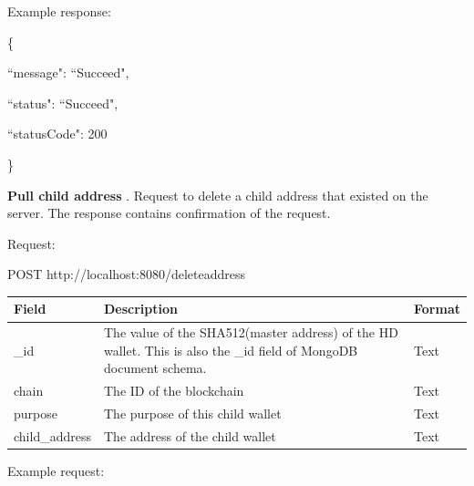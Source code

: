 Example response:

\begin{framed}
    \hspace*{13mm}        \{ \par
    \hspace*{13mm}                ``message": ``Succeed",    \par
    \hspace*{13mm}                ``status": ``Succeed",    \par
    \hspace*{13mm}             ``statusCode": 200    \par
    \hspace*{13mm}                 \}    \par
\end{framed}


\bigskip
{\textbf{Pull child address }}. Request to delete a child address that existed on the server. The response contains confirmation of the request.

Request:

\begin{framed}
    POST http://localhost:8080/deleteaddress
\end{framed}

\begin{tabular}{m{3cm} m{9cm}  m{2.6cm}}
    \toprule
    Field & Description & Format                                            \\ 
    \midrule
    \_id & The value of the SHA512(master address) of the HD wallet. This is also the \_id field of MongoDB document schema.  & Text   \\ 
    chain   & The ID of the blockchain & Text    \\ 
    purpose   & The purpose of this child wallet & Text    \\ 
    child\_address   & The address of the child wallet & Text    \\ 
    \bottomrule

\end{tabular}
\bigskip

Example request:

